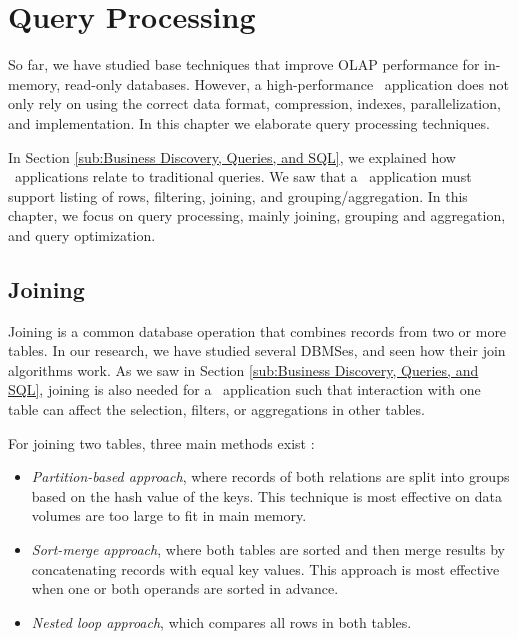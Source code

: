 \chapter{Query Processing}
\label{chap:Query Processing}
So far, we have studied base techniques that improve OLAP performance for in-memory, read-only databases. However, a high-performance \bd~application does not only rely on using the correct data format, compression, indexes, parallelization, and implementation. In this chapter we elaborate query processing techniques.

In Section \ref{sub:Business Discovery, Queries, and SQL}, we explained how \bd~applications relate to traditional queries. We saw that a \bd~application must support listing of rows, filtering, joining, and grouping/aggregation. In this chapter, we focus on query processing, mainly joining, grouping and aggregation, and query optimization.





\newpage

\section{Joining}
\label{sec:Joining}
Joining is a common database operation that combines records from two or more tables. In our research, we have studied several DBMSes, and seen how their join algorithms work. As we saw in Section \ref{sub:Business Discovery, Queries, and SQL}, joining is also needed for a \bd~application such that interaction with one table can affect the selection, filters, or aggregations in other tables.

For joining two tables, three main methods exist \cite{Bratbergsengen2015-ed}: 
\begin{itemize}
  \item \textit{Partition-based approach}, where records of both relations are split into groups based on the hash value of the keys. This technique is most effective on data volumes are too large to fit in main memory.
  \item \textit{Sort-merge approach}, where both tables are sorted and then merge results by concatenating records with equal key values. This approach is most effective when one or both operands are sorted in advance.
  \item \textit{Nested loop approach}, which compares all rows in both tables.
\end{itemize}

